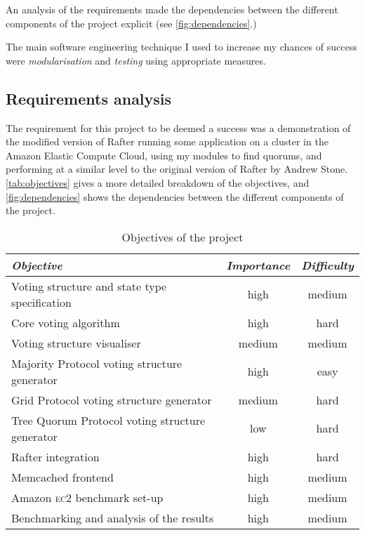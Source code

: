 \documentclass[draft,11pt,chapterprefix=true,toc=bibliography,numbers=noendperiod,
               footnotes=multiple,twoside]{scrreprt}
\newcommand{\ECC}[0]{\textsc{ec}2 }
\begin{document}
An analysis of the requirements made the dependencies between the different components of the project explicit (see \autoref{fig:dependencies}.)

The main software engineering technique I used to increase my chances of success were \emph{modularisation} and \emph{testing} using appropriate measures.

\subsection{Requirements analysis\label{sc:requirements-analysis}}

The requirement for this project to be deemed a success was a demonstration of the modified version of Rafter running some application on a cluster in the Amazon Elastic Compute Cloud, using my modules to find quorums, and performing at a similar level to the original version of Rafter by Andrew Stone. \autoref{tab:objectives} gives a more detailed breakdown of the objectives, and \autoref{fig:dependencies} shows the dependencies between the different components of the project.

\begin{table}[h]
    \centering
    \begin{tabularx}{\textwidth}{X c c}
        \toprule
        \textit{Objective} & \textit{Importance} & \textit{Difficulty} \\
        \midrule
        Voting structure and state type specification & high & medium \\
        Core voting algorithm & high & hard \\
        Voting structure visualiser & medium & medium \\
        Majority Protocol voting structure generator & high & easy \\
        Grid Protocol voting structure generator & medium & hard \\
        Tree Quorum Protocol voting structure generator & low & hard \\
        Rafter integration & high & hard \\
        Memcached frontend & high & medium \\
        Amazon \ECC benchmark set-up & high & medium \\
        Benchmarking and analysis of the results & high & medium \\
        \bottomrule
    \end{tabularx}
    \caption{Objectives of the project}
    \label{tab:objectives}
\end{table}
\end{document}
